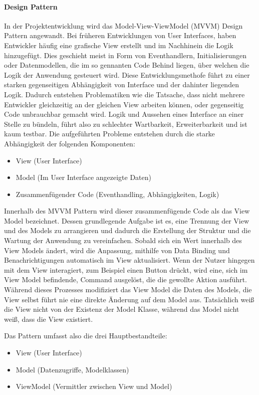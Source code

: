\paragraph{Design Pattern}
In der Projektentwicklung wird das Model-View-ViewModel (MVVM) Design Pattern angewandt.
Bei früheren Entwicklungen von User Interfaces, haben Entwickler häufig eine grafische View erstellt und im Nachhinein die Logik hinzugefügt.
Dies geschieht meist in Form von Eventhandlern, Initialisierungen oder Datenmodellen, die im so gennanten Code Behind liegen, über welchen die Logik der Anwendung gesteuert wird.
Diese Entwicklungsmethofe führt zu einer starken gegenseitigen Abhängigkeit von Interface und der dahinter liegenden Logik.
Dadurch entstehen Problematiken wie die Tatsache, dass nicht mehrere Entwickler gleichzeitig an der gleichen View arbeiten können, oder gegenseitig Code unbrauchbar gemacht wird.
Logik und Aussehen eines Interface an einer Stelle zu bündeln, führt also zu schlechter Wartbarkeit, Erweiterbarkeit und ist kaum testbar\cite{.g}.
Die aufgeführten Probleme entstehen durch die starke Abhängigkeit der folgenden Komponenten:

\begin{itemize}
 	\item View (User Interface)
 	\item Model (Im User Interface angezeigte Daten)
	\item Zusammenfügender Code (Eventhandling, Abhängigkeiten, Logik)
\end{itemize}

Innerhalb des MVVM Pattern wird dieser zusammenfügende Code als das View Model bezeichnet.
Dessen grundlegende Aufgabe ist es, eine Trennung der View und des Models zu arrangieren und dadurch die Erstellung der Struktur und die Wartung der Anwendung zu vereinfachen.
Sobald sich ein Wert innerhalb des View Models ändert, wird die Anpassung, mithilfe von Data Binding und Benachrichtigungen automatisch im View aktualisiert.
Wenn der Nutzer hingegen mit dem View interagiert, zum Beispiel einen Button drückt, wird eine, sich im View Model befindende, Command ausgelöst, die die gewollte Aktion ausführt.
Während dieses Prozesses modifiziert das View Model die Daten des Models, die View selbst führt nie eine direkte Änderung auf dem Model aus.
Tatsächlich weiß die View nicht von der Existenz der Model Klasse, während das Model nicht weiß, dass die View existiert.

Das Pattern umfasst also die drei Hauptbestandteile:
\begin{itemize}
 	\item View (User Interface)
 	\item Model (Datenzugriffe, Modelklassen)
	\item ViewModel (Vermittler zwischen View und Model)
\end{itemize}

